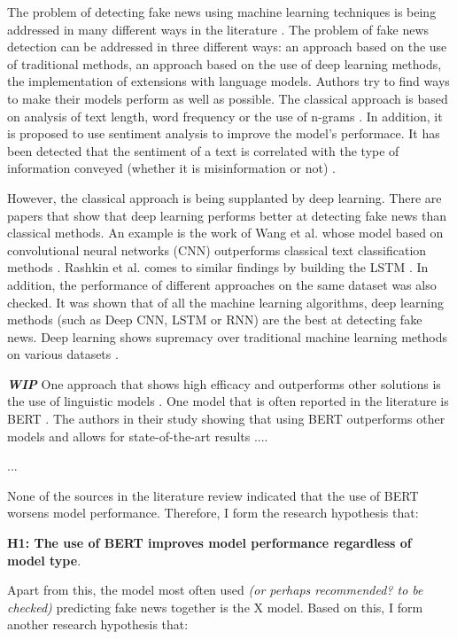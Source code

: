 The problem of detecting fake news using machine learning techniques is being addressed in many different ways in the literature \autocite{Pathak2020}. The problem of fake news detection can be addressed in three different ways: an approach based on the use of traditional methods, an approach based on the use of deep learning methods, the implementation of extensions with language models. Authors try to find ways to make their models perform as well as possible. The classical approach is based on analysis of text length, word frequency or the use of n-grams \autocite{Shu2017}. In addition, it is proposed to use sentiment analysis to improve the model's performace. It has been detected that the sentiment of a text is correlated with the type of information conveyed (whether it is misinformation or not) \autocite{rubin2016fake}.

However, the classical approach is being supplanted by deep learning. There are papers that show that deep learning performs better at detecting fake news than classical methods. An example is the work of Wang et al. whose model based on convolutional neural networks (CNN) outperforms classical text classification methods \autocite{wang-2017-liar}. Rashkin et al. comes to similar findings by building the LSTM \autocite{rashkin-etal-2017-truth}. In addition, the performance of different approaches on the same dataset was also checked. It was shown that of all the machine learning algorithms, deep learning methods (such as Deep CNN, LSTM or RNN) are the best at detecting fake news. Deep learning shows supremacy over traditional machine learning methods on various datasets \autocite{IEEE2021}. 

\textit{\textbf{WIP}} One approach that shows high efficacy and outperforms other solutions is the use of linguistic models \autocite{Conroy2015}. One model that is often reported in the literature is BERT \autocite{}. The authors in their study showing that using BERT outperforms other models and allows for state-of-the-art results \autocite{} ....

...

None of the sources in the literature review indicated that the use of BERT worsens model performance. Therefore, I form the research hypothesis that:
\vspace{0.2cm}

\noindent\textbf{H1: The use of BERT improves model performance regardless of model type}.
\vspace{0.2cm}

Apart from this, the model most often used \textit{(or perhaps recommended? to be checked)} predicting fake news together is the X model. Based on this, I form another research hypothesis that:
\vspace{0.2cm}

